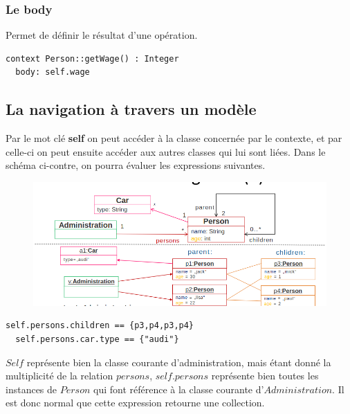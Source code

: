 \documentclass[../Syllabus.tex]{subfiles}
\begin{document}
\subsubsection{Le body}

Permet de définir le résultat d'une opération.

\begin{lstlisting}[language=OCL]
  context Person::getWage() : Integer
  body: self.wage
\end{lstlisting}

\newpage

\subsection{La navigation à travers un modèle}

Par le mot clé \textbf{self} on peut accéder à la classe concernée par le contexte, et par celle-ci on peut ensuite accéder aux autres classes qui lui sont liées. Dans le schéma ci-contre, on pourra évaluer les expressions suivantes.

\begin{figure}
  \includegraphics[scale=0.35]{img/exempleNavigation1.png}
\end{figure}

\noindent\begin{lstlisting}[language=OCL]
  self.persons.children == {p3,p4,p3,p4}
  self.persons.car.type == {"audi"}
\end{lstlisting}

$Self$ représente bien la classe courante d'administration, mais étant donné la multiplicité de la relation $persons$, $self.persons$ représente bien toutes les instances de $Person$ qui font référence à la classe courante d'$Administration$. Il est donc normal que cette expression retourne une collection.

\vspace{0.5cm}
\end{document}
